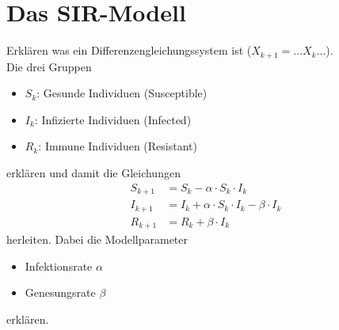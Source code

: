 \documentclass[11pt,a4paper]{article}
\begin{document}
\section{Das SIR-Modell}
Erklären was ein Differenzengleichungssystem ist (\(X_{k+1} = ... X_k ...\)).\\
Die drei Gruppen
\begin{itemize}
	\item \(S_k\): Gesunde Individuen (Susceptible)
	\item \(I_k\): Infizierte Individuen (Infected)
	\item \(R_k\): Immune Individuen (Resistant)
\end{itemize}
erklären und damit die Gleichungen
\begin{align*}
	S_{k+1} &= S_k - \alpha \cdot S_k \cdot I_k \\
	I_{k+1} &= I_k + \alpha \cdot S_k \cdot I_k - \beta \cdot I_k \\
	R_{k+1} &= R_k + \beta \cdot I_k
\end{align*}
herleiten. Dabei die Modellparameter
\begin{itemize}
	\item Infektionsrate \(\alpha\)
	\item Genesungsrate \(\beta\)
\end{itemize}
erklären.
\end{document}
